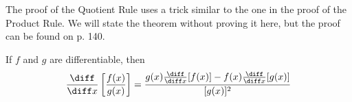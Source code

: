 \begin{frame}
The proof of the Quotient Rule uses a trick similar to the one in the proof of the Product Rule.  We will state the theorem without proving it here, but the proof can be found on p. 140.
\begin{theorem}
If $f$ and $g$ are differentiable, then
\[
\frac{\diff}{\diff x} \left[ \frac{f(x)}{g(x)}\right] = \frac{g(x)\frac{\diff}{\diff x} [f(x)] - f(x) \frac{\diff}{\diff x}[g(x)]}{[g(x)]^2}
\]
\end{theorem}
\end{frame}
